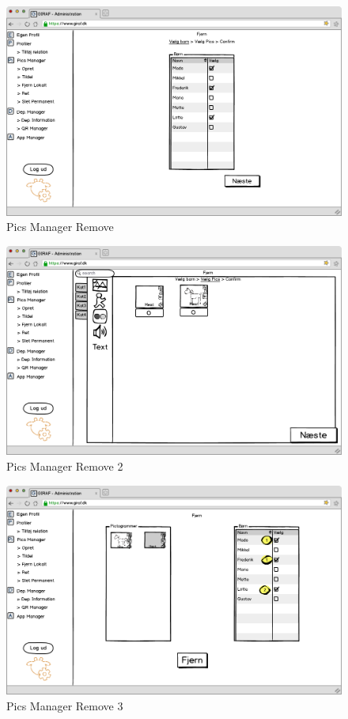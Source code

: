 \newpage

\begin{figure}[!h]
\centering
\includegraphics[width=1\textwidth]{images/mockup/picsManagerFjern.png}
\caption{Pics Manager Remove}
\label{fig:pics_manager_remove}
\end{figure}

\begin{figure}[!h]
\centering
\includegraphics[width=1\textwidth]{images/mockup/picsManagerFjern2.png}
\caption{Pics Manager Remove 2}
\label{fig:pics_manager_remove2}
\end{figure}

\newpage

\begin{figure}[!h]
\centering
\includegraphics[width=1\textwidth]{images/mockup/picsManagerFjern3.png}
\caption{Pics Manager Remove 3}
\label{fig:pics_manager_remove3}
\end{figure}


